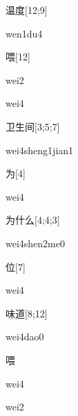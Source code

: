 \begin{verbete}[wen1du4]{温度}[12;9]
\begin{pronuncia}{wen1du4}
\end{pronuncia}
\end{verbete}

\begin{verbete}[wei2]{喂}[12]
\begin{pronuncia}{wei2}
\end{pronuncia}
\begin{pronuncia}{wei4}
\end{pronuncia}
\end{verbete}

\begin{verbete}{卫生间}[3;5;7]
\begin{pronuncia}{wei4sheng1jian1}
\end{pronuncia}
\end{verbete}

\begin{verbete}[wei4]{为}[4]
\begin{pronuncia}{wei4}
\end{pronuncia}
\end{verbete}

\begin{verbete}{为什么}[4;4;3]
\begin{pronuncia}{wei4shen2me0}
\end{pronuncia}
\end{verbete}

\begin{verbete}[wei4]{位}[7]
\begin{pronuncia}{wei4}
\end{pronuncia}
\end{verbete}

\begin{verbete}{味道}[8;12]
\begin{pronuncia}{wei4dao0}
\end{pronuncia}
\end{verbete}

\begin{verbete}[wei4]{喂}
\begin{pronuncia}{wei4}
\end{pronuncia}
\begin{pronuncia}{wei2}
\end{pronuncia}
\end{verbete}

